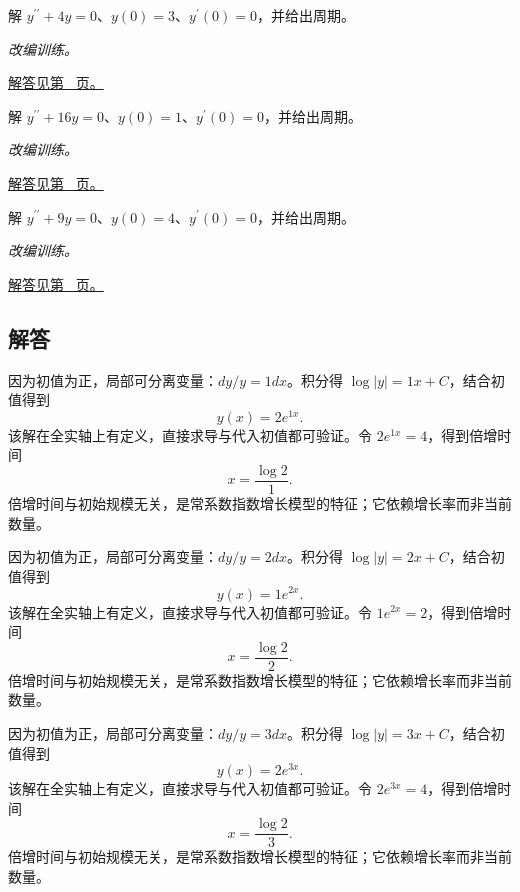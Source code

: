 \documentclass[12pt,fontset=fandol]{ctexart}
\begin{document}
\begin{example}[简谐振动初值问题]\label{ex:c22q22}
解 $y^{\prime\prime}+4y=0$、$y(0)=3$、$y^{\prime}(0)=0$，并给出周期。
\par\textit{改编训练。}\par\hyperref[ans:c22q22]{解答见第~\pageref{ans:c22q22} 页。}
\end{example}
\begin{example}[简谐振动初值问题]\label{ex:c22q23}
解 $y^{\prime\prime}+16y=0$、$y(0)=1$、$y^{\prime}(0)=0$，并给出周期。
\par\textit{改编训练。}\par\hyperref[ans:c22q23]{解答见第~\pageref{ans:c22q23} 页。}
\end{example}
\begin{example}[简谐振动初值问题]\label{ex:c22q24}
解 $y^{\prime\prime}+9y=0$、$y(0)=4$、$y^{\prime}(0)=0$，并给出周期。
\par\textit{改编训练。}\par\hyperref[ans:c22q24]{解答见第~\pageref{ans:c22q24} 页。}
\end{example}
\subsection{解答}
\begin{solve}\label{ans:c22q1}
因为初值为正，局部可分离变量：$dy/y=1dx$。积分得 $\log|y|=1x+C$，结合初值得到
\[
y(x)=2e^{1x}.
\]
该解在全实轴上有定义，直接求导与代入初值都可验证。令 $2e^{1x}=4$，得到倍增时间
\[
x=\frac{\log2}{1}.
\]
倍增时间与初始规模无关，是常系数指数增长模型的特征；它依赖增长率而非当前数量。
\end{solve}

\begin{solve}\label{ans:c22q2}
因为初值为正，局部可分离变量：$dy/y=2dx$。积分得 $\log|y|=2x+C$，结合初值得到
\[
y(x)=1e^{2x}.
\]
该解在全实轴上有定义，直接求导与代入初值都可验证。令 $1e^{2x}=2$，得到倍增时间
\[
x=\frac{\log2}{2}.
\]
倍增时间与初始规模无关，是常系数指数增长模型的特征；它依赖增长率而非当前数量。
\end{solve}

\begin{solve}\label{ans:c22q3}
因为初值为正，局部可分离变量：$dy/y=3dx$。积分得 $\log|y|=3x+C$，结合初值得到
\[
y(x)=2e^{3x}.
\]
该解在全实轴上有定义，直接求导与代入初值都可验证。令 $2e^{3x}=4$，得到倍增时间
\[
x=\frac{\log2}{3}.
\]
倍增时间与初始规模无关，是常系数指数增长模型的特征；它依赖增长率而非当前数量。
\end{solve}
\end{document}
